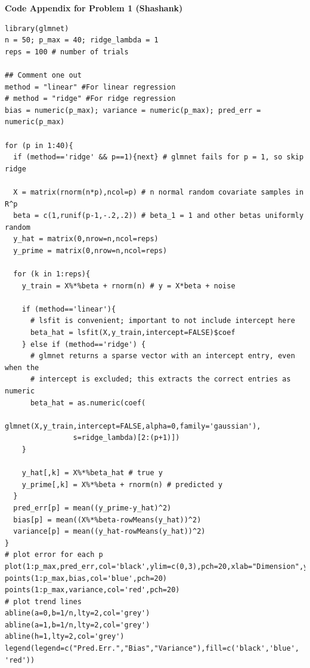 \documentclass[11pt]{article}
\begin{document}
\newpage
\begin{framed}
\label{app:code}
{\bf\large Code Appendix for Problem 1 (Shashank)}
\small
\begin{verbatim}
library(glmnet)
n = 50; p_max = 40; ridge_lambda = 1
reps = 100 # number of trials

## Comment one out
method = "linear" #For linear regression
# method = "ridge" #For ridge regression
bias = numeric(p_max); variance = numeric(p_max); pred_err = numeric(p_max)

for (p in 1:40){
  if (method=='ridge' && p==1){next} # glmnet fails for p = 1, so skip ridge

  X = matrix(rnorm(n*p),ncol=p) # n normal random covariate samples in R^p
  beta = c(1,runif(p-1,-.2,.2)) # beta_1 = 1 and other betas uniformly random
  y_hat = matrix(0,nrow=n,ncol=reps)
  y_prime = matrix(0,nrow=n,ncol=reps)

  for (k in 1:reps){
    y_train = X%*%beta + rnorm(n) # y = X*beta + noise

    if (method=='linear'){
      # lsfit is convenient; important to not include intercept here
      beta_hat = lsfit(X,y_train,intercept=FALSE)$coef
    } else if (method=='ridge') {
      # glmnet returns a sparse vector with an intercept entry, even when the
      # intercept is excluded; this extracts the correct entries as numeric
      beta_hat = as.numeric(coef(
                    glmnet(X,y_train,intercept=FALSE,alpha=0,family='gaussian'),
                s=ridge_lambda)[2:(p+1)])
    }

    y_hat[,k] = X%*%beta_hat # true y
    y_prime[,k] = X%*%beta + rnorm(n) # predicted y
  }
  pred_err[p] = mean((y_prime-y_hat)^2)
  bias[p] = mean((X%*%beta-rowMeans(y_hat))^2)
  variance[p] = mean((y_hat-rowMeans(y_hat))^2)
}
# plot error for each p
plot(1:p_max,pred_err,col='black',ylim=c(0,3),pch=20,xlab="Dimension",ylab="")
points(1:p_max,bias,col='blue',pch=20)
points(1:p_max,variance,col='red',pch=20)
# plot trend lines
abline(a=0,b=1/n,lty=2,col='grey')
abline(a=1,b=1/n,lty=2,col='grey')
abline(h=1,lty=2,col='grey')
legend(legend=c("Pred.Err.","Bias","Variance"),fill=c('black','blue', 'red'))
\end{verbatim}
\end{framed}
\end{document}
